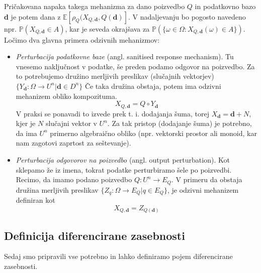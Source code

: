 \documentclass[12pt,a4paper]{amsart}
\theoremstyle{definition} %
\theoremstyle{plain} %
\begin{document}
Pričakovana napaka takega mehanizma za dano poizvedbo $Q$ in podatkovno bazo \textbf{d} je potem dana z $\mathbb{E}[\rho_{Q}(X_{Q,\textbf{d}},Q(\textbf{d})]$. 
V nadaljevanju bo pogosto navedeno npr. $\mathbb{P}(X_{Q,\textbf{d}} \in A)$, kar je seveda okrajšava za $\mathbb{P}(\{\omega \in \Omega : X_{Q,\textbf{d}}(\omega) \in A \})$.
\newline
\newline
Ločimo dva glavna primera odzivnih mehanizmov:
\begin{itemize}
\item \textit{Perturbacija podatkovne baze} (angl. sanitised response mechanism). Tu vnesemo naključnost v podatke, še preden podamo odgovor na poizvedbo. Za to potrebujemo družino merljivih preslikav (slučajnih vektorjev) $\{ Y_{\textbf{d}}: \Omega \rightarrow U^n | \textbf{d} \in D^n\}$ Če taka družina obstaja, potem ima odzivni mehanizem obliko kompozituma.
\begin{equation}\label{odzivni2}
 X_{Q,\textbf{d}} = Q \circ Y_{\textbf{d}} \tag{2}
\end{equation} 
V praksi se ponavadi to izvede prek t. i. dodajanja šuma, torej $X_{\textbf{d}} = \textbf{d}+N$, kjer je $N$ slučajni vektor v $U^n$. Za tak pristop (dodajanje šuma) je potrebno, da ima $U^n$ primerno algebraično obliko (npr. vektorski prostor ali monoid, kar nam zagotovi zaprtost za seštevanje).
\item \textit{Perturbacija odgovorov na poizvedbo} (angl. output perturbation). Kot sklepamo že iz imena, tokrat podatke perturbiramo šele po poizvedbi. Recimo, da imamo podano poizvedbo $Q: U^n \rightarrow E_{Q}$. V primeru da obstaja družina merljivih preslikav $ \{Z_{q}:\Omega \rightarrow E_{Q} | q  \in E_{Q} \}$, je odzivni mehanizem definiran kot
\begin{equation}\label{odzivni3}
X_{Q,\textbf{d}}=Z_{Q(\textbf{d})}\tag{3}
\end{equation} 
\end{itemize}

\subsection{Definicija diferencirane zasebnosti}
Sedaj smo pripravili vse potrebno in lahko definiramo pojem diferencirane zasebnosti.
\end{document}
